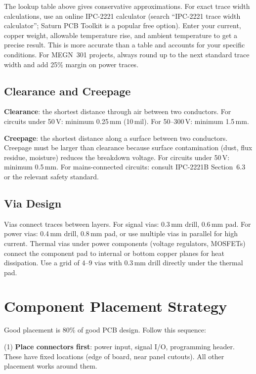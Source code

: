 \begin{tipbox}
The lookup table above gives conservative approximations. For exact trace width calculations, use an online IPC-2221 calculator (search ``IPC-2221 trace width calculator''; Saturn PCB Toolkit is a popular free option). Enter your current, copper weight, allowable temperature rise, and ambient temperature to get a precise result. This is more accurate than a table and accounts for your specific conditions. For MEGN~301 projects, always round up to the next standard trace width and add 25\% margin on power traces.
\end{tipbox}

\subsection{Clearance and Creepage}
\textbf{Clearance}: the shortest distance through air between two conductors. For circuits under 50\,V: minimum 0.25\,mm (10\,mil). For 50--300\,V: minimum 1.5\,mm.

\textbf{Creepage}: the shortest distance along a surface between two conductors. Creepage must be larger than clearance because surface contamination (dust, flux residue, moisture) reduces the breakdown voltage. For circuits under 50\,V: minimum 0.5\,mm. For mains-connected circuits: consult IPC-2221B Section~6.3 or the relevant safety standard.

\subsection{Via Design}
Vias connect traces between layers. For signal vias: 0.3\,mm drill, 0.6\,mm pad. For power vias: 0.4\,mm drill, 0.8\,mm pad, or use multiple vias in parallel for high current. Thermal vias under power components (voltage regulators, MOSFETs) connect the component pad to internal or bottom copper planes for heat dissipation. Use a grid of 4--9 vias with 0.3\,mm drill directly under the thermal pad.

\section{Component Placement Strategy}
Good placement is 80\% of good PCB design. Follow this sequence:

(1) \textbf{Place connectors first}: power input, signal I/O, programming header. These have fixed locations (edge of board, near panel cutouts). All other placement works around them.

